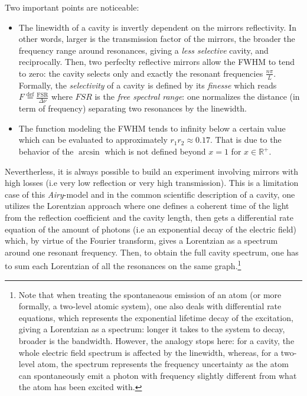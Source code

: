 \documentclass[11pt]{report}
\begin{document}
Two important points are noticeable:
\begin{itemize}
	\item The linewidth of a cavity is invertly dependent on the mirrors reflectivity. In other words, larger is the transmission factor of the mirrors, the broader the frequency range around resonances, giving a \textit{less selective} cavity, and reciprocally. Then, two perfeclty reflective mirrors allow the FWHM to tend to zero: the cavity selects only and exactly the resonant frequencies $\frac{n\pi}{L}$. Formally, the \textit{selectivity} of a cavity is defined by its \textit{finesse} which reads $F \stackrel{\text{def}}{=} \frac{\textrm{FSR}}{\Delta\nu}$ where $FSR$ is the \textit{free spectral range}: one normalizes the distance (in term of frequency) separating two resonances by the linewidth.
	\item The function modeling the FWHM tends to infinity below a certain value which can be evaluated to approximately $r_1r_2 \approx 0.17$. That is due to the behavior of the $\arcsin$ which is not defined beyond $x=1$ for $x \in \mathbb{R}^+$. 
\end{itemize}

Nevertherless, it is always possible to build an experiment involving mirrors with high losses (i.e very low reflection or very high transmission). This is a limitation case of this \textit{Airy}-model and in the common scientific description of a cavity, one utilizes the Lorentzian approach where one defines a coherent time of the light from the reflection coefficient and the cavity length, then gets a differential rate equation of the amount of photons (i.e an exponential decay of the electric field) which, by virtue of the Fourier transform, gives a Lorentzian as a spectrum around one resonant frequency. Then, to obtain the full cavity spectrum, one has to sum each Lorentzian of all the resonances on the same graph.\footnote{Note that when treating the spontaneaous emission of an atom (or more formally, a two-level atomic system), one also deals with differential rate equations, which represents the exponential lifetime decay of the excitation, giving a Lorentzian as a spectrum: longer it takes to the system to decay, broader is the bandwidth. However, the analogy stops here: for a cavity, the whole electric field spectrum is affected by the linewidth, whereas, for a two-level atom, the spectrum represents the frequency uncertainty as the atom can spontaneously emit a photon with frequency slightly different from what the atom has been excited with.}
\end{document}
